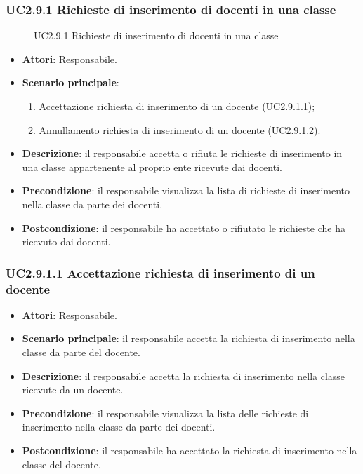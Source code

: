 \subsubsection{UC2.9.1 Richieste di inserimento di docenti in una classe}
\begin{figure}[H]
\centering
\noindent{}
\caption{UC2.9.1 Richieste di inserimento di docenti in una classe}
\end{figure}
\begin{itemize}
\item \textbf{Attori}: Responsabile.
\item \textbf{Scenario principale}:
\begin{enumerate}
\item Accettazione richiesta di inserimento di un docente (UC2.9.1.1);
\item Annullamento richiesta di inserimento di un docente (UC2.9.1.2).
\end{enumerate}
\item \textbf{Descrizione}: il responsabile accetta o rifiuta le richieste di inserimento in una classe appartenente al proprio ente ricevute dai docenti.
\item \textbf{Precondizione}: il responsabile visualizza la lista di richieste di inserimento nella classe da parte dei docenti.
\item \textbf{Postcondizione}: il responsabile ha accettato o rifiutato le richieste che ha ricevuto dai docenti.
\end{itemize}
\subsubsection{UC2.9.1.1 Accettazione richiesta di inserimento di un docente}
\begin{itemize}
\item \textbf{Attori}: Responsabile.
\item \textbf{Scenario principale}: il responsabile accetta la richiesta di inserimento nella classe da parte del docente.
\item \textbf{Descrizione}: il responsabile accetta la richiesta di inserimento nella classe ricevute da un docente.
\item \textbf{Precondizione}: il responsabile visualizza la lista delle richieste di inserimento nella classe da parte dei docenti.
\item \textbf{Postcondizione}: il responsabile ha accettato la richiesta di inserimento nella classe del docente.
\end{itemize}
